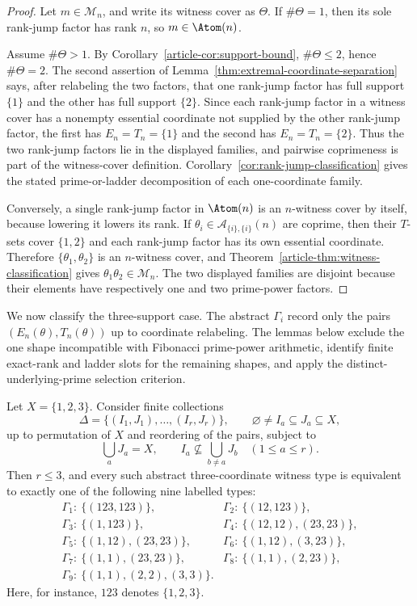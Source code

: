 \begin{proof}
Let $m\in\mathcal M_n$, and write its witness cover as $\Theta$. If
$\#\Theta=1$, then its sole rank-jump factor has rank $n$, so $m\in\Atom(n)$.

Assume $\#\Theta>1$. By Corollary~\ref{article-cor:support-bound},
$\#\Theta\le2$, hence $\#\Theta=2$. The second assertion of
Lemma~\ref{thm:extremal-coordinate-separation} says, after relabeling the
two factors, that one rank-jump factor has full support $\{1\}$ and the other has full
support $\{2\}$. Since each rank-jump factor in a witness cover has a nonempty essential
coordinate not supplied by the other rank-jump factor, the first has
$E_n=T_n=\{1\}$ and the second has $E_n=T_n=\{2\}$. Thus the two rank-jump factors lie in
the displayed families, and pairwise coprimeness is part of the witness-cover
definition. Corollary~\ref{cor:rank-jump-classification} gives the stated
prime-or-ladder decomposition of each one-coordinate family.

Conversely, a single rank-jump factor in $\Atom(n)$ is an $n$-witness cover by itself,
because lowering it lowers its rank. If
$\theta_i\in\mathcal A_{\{i\},\{i\}}(n)$ are coprime, then their
$T$-sets cover $\{1,2\}$ and each rank-jump factor has its own essential coordinate.
Therefore $\{\theta_1,\theta_2\}$ is an $n$-witness cover, and
Theorem~\ref{article-thm:witness-classification} gives
$\theta_1\theta_2\in\mathcal M_n$. The two displayed families are disjoint
because their elements have respectively one and two prime-power factors.
\end{proof}

We now classify the three-support case. The abstract $\Gamma_i$ record only
the pairs $(E_n(\theta),T_n(\theta))$ up to coordinate relabeling. The lemmas
below exclude the one shape incompatible with Fibonacci prime-power arithmetic,
identify finite exact-rank and ladder slots for the remaining shapes, and apply
the distinct-underlying-prime selection criterion.

\begin{lemma}\label{lem:abstract-three-types}
Let $X=\{1,2,3\}$. Consider finite collections
\[
\Delta=\{(I_1,J_1),\dots,(I_r,J_r)\},\qquad
\varnothing\ne I_a\subseteq J_a\subseteq X,
\]
up to permutation of $X$ and reordering of the pairs, subject to
\[
\bigcup_a J_a=X,\qquad
I_a\nsubseteq\bigcup_{b\ne a}J_b\quad(1\le a\le r).
\]
Then $r\le3$, and every such abstract three-coordinate witness type is
equivalent to exactly one of the following nine labelled types:
\[
\begin{array}{ll}
\Gamma_1:\ \{(123,123)\},&
\Gamma_2:\ \{(12,123)\},\\
\Gamma_3:\ \{(1,123)\},&
\Gamma_4:\ \{(12,12),(23,23)\},\\
\Gamma_5:\ \{(1,12),(23,23)\},&
\Gamma_6:\ \{(1,12),(3,23)\},\\
\Gamma_7:\ \{(1,1),(23,23)\},&
\Gamma_8:\ \{(1,1),(2,23)\},\\
\Gamma_9:\ \{(1,1),(2,2),(3,3)\}.
\end{array}
\]
Here, for instance, $123$ denotes $\{1,2,3\}$.
\end{lemma}

